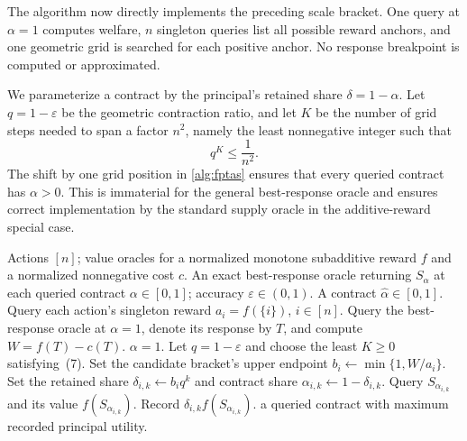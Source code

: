 \documentclass[11pt]{article}
\newcommand{\eps}{\varepsilon}
\begin{document}
The algorithm now directly implements the preceding scale bracket.
One query at $\alpha=1$ computes welfare, $n$ singleton queries list all
possible reward anchors, and one geometric grid is searched for each
positive anchor.  No response breakpoint is computed or approximated.

We parameterize a contract by the principal's retained share
$\delta=1-\alpha$.  Let $q=1-\eps$ be the geometric contraction ratio, and
let $K$ be the number of grid steps needed to span a factor $n^2$, namely the
least nonnegative integer such that
\[
                         q^K\leq\frac{1}{n^2}.             \tag{7}
\]
The shift by one grid position in \cref{alg:fptas} ensures that every queried
contract has $\alpha>0$.  This is immaterial for the general best-response
oracle and ensures correct implementation by the standard supply oracle in
the additive-reward special case.

\begin{algorithm}[H]
\caption{Reward-anchored geometric search}\label{alg:fptas}
\begin{algorithmic}[1]
\Require Actions $[n]$; value oracles for a normalized monotone subadditive
         reward $f$ and a normalized nonnegative cost $c$.
\Require An exact best-response oracle returning $S_\alpha$ at each queried
         contract $\alpha\in[0,1]$; accuracy $\eps\in(0,1)$.
\Ensure A contract $\widehat\alpha\in[0,1]$.
\State Query each action's singleton reward $a_i=f(\{i\})$, $i\in[n]$.
\State Query the best-response oracle at $\alpha=1$, denote its response by
       $T$, and compute $W=f(T)-c(T)$.
   \State \Return $\alpha=1$.
\EndIf
\State Let $q=1-\eps$ and choose the least $K\geq0$ satisfying~(7).
   \State Set the candidate bracket's upper endpoint
          $b_i\gets\min\{1,W/a_i\}$.
      \State Set the retained share $\delta_{i,k}\gets b_i q^k$ and
             contract share $\alpha_{i,k}\gets1-\delta_{i,k}$.
      \State Query $S_{\alpha_{i,k}}$ and its value
             $f(S_{\alpha_{i,k}})$.
      \State Record $\delta_{i,k}f(S_{\alpha_{i,k}})$.
   \EndFor
\EndFor
\State \Return a queried contract with maximum recorded principal utility.
\end{algorithmic}
\end{algorithm}
\end{document}
